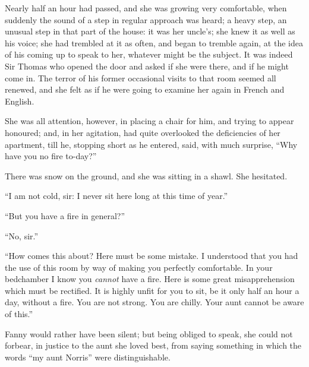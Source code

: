Nearly half an hour had passed, and she was growing
very comfortable, when suddenly the sound of a step
in regular approach was heard; a heavy step, an unusual
step in that part of the house:  it was her uncle's;
she knew it as well as his voice; she had trembled at it
as often, and began to tremble again, at the idea of his
coming up to speak to her, whatever might be the subject.
It was indeed Sir Thomas who opened the door and asked
if she were there, and if he might come in.  The terror
of his former occasional visits to that room seemed
all renewed, and she felt as if he were going to examine
her again in French and English.

She was all attention, however, in placing a chair for him,
and trying to appear honoured; and, in her agitation,
had quite overlooked the deficiencies of her apartment, till he,
stopping short as he entered, said, with much surprise,
``Why have you no fire to-day?''

There was snow on the ground, and she was sitting in a shawl.
She hesitated.

``I am not cold, sir:  I never sit here long at this time
of year.''

``But you have a fire in general?''

``No, sir.''

``How comes this about?  Here must be some mistake.
I understood that you had the use of this room by way
of making you perfectly comfortable.  In your bedchamber
I know you \emph{cannot} have a fire.  Here is some great
misapprehension which must be rectified.  It is highly
unfit for you to sit, be it only half an hour a day,
without a fire.  You are not strong.  You are chilly.
Your aunt cannot be aware of this.''

Fanny would rather have been silent; but being obliged
to speak, she could not forbear, in justice to the aunt
she loved best, from saying something in which the words
``my aunt Norris'' were distinguishable.

